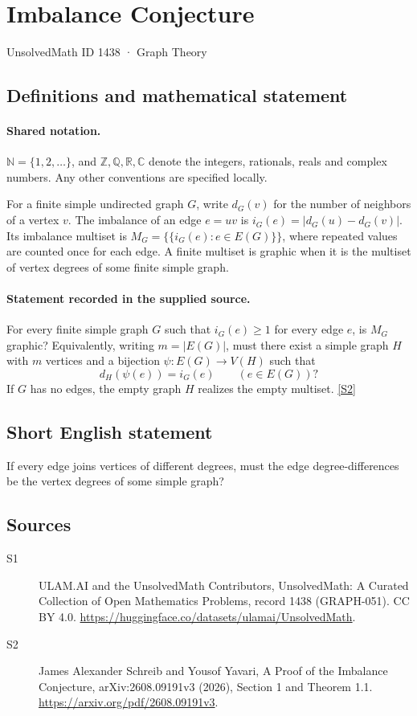 \documentclass[11pt]{article}
\newcommand{\sref}[2]{\hyperlink{source:#1:#2}{[S#2]}}
\begin{document}
\setcounter{section}{1437}
\section{Imbalance Conjecture}\label{1438}
{\small\sffamily UnsolvedMath ID 1438 · Graph Theory}
\subsection{Definitions and mathematical statement}

\paragraph{Shared notation.}$\mathbb N=\{1,2,\ldots\}$, and $\mathbb Z,\mathbb Q,\mathbb R,\mathbb C$ denote the integers, rationals, reals and complex numbers. Any other conventions are specified locally.


For a finite simple undirected graph $G$, write $d_G(v)$ for the number of neighbors of a vertex $v$. The imbalance of an edge $e=uv$ is $i_G(e)=|d_G(u)-d_G(v)|$. Its imbalance multiset is $M_G=\{\!\{i_G(e):e\in E(G)\}\!\}$, where repeated values are counted once for each edge. A finite multiset is graphic when it is the multiset of vertex degrees of some finite simple graph.
\paragraph{Statement recorded in the supplied source.}
For every finite simple graph $G$ such that $i_G(e)\ge1$ for every edge $e$, is $M_G$ graphic? Equivalently, writing $m=|E(G)|$, must there exist a simple graph $H$ with $m$ vertices and a bijection $\psi:E(G)\to V(H)$ such that
\[
 d_H(\psi(e))=i_G(e)\qquad(e\in E(G))?
\]
If $G$ has no edges, the empty graph $H$ realizes the empty multiset. \sref{1438}{2}
\subsection{Short English statement}
If every edge joins vertices of different degrees, must the edge degree-differences be the vertex degrees of some simple graph?
\subsection{Sources}
\begin{description}
\item[\hypertarget{source:1438:1}{S1}] ULAM.AI and the UnsolvedMath Contributors, UnsolvedMath: A Curated Collection of Open Mathematics Problems, record 1438 (GRAPH-051). CC BY 4.0. \url{https://huggingface.co/datasets/ulamai/UnsolvedMath}.
\item[\hypertarget{source:1438:2}{S2}] James Alexander Schreib and Yousof Yavari, A Proof of the Imbalance Conjecture, arXiv:2608.09191v3 (2026), Section 1 and Theorem 1.1. \url{https://arxiv.org/pdf/2608.09191v3}.
\end{description}
\label{end:1438}
\end{document}
